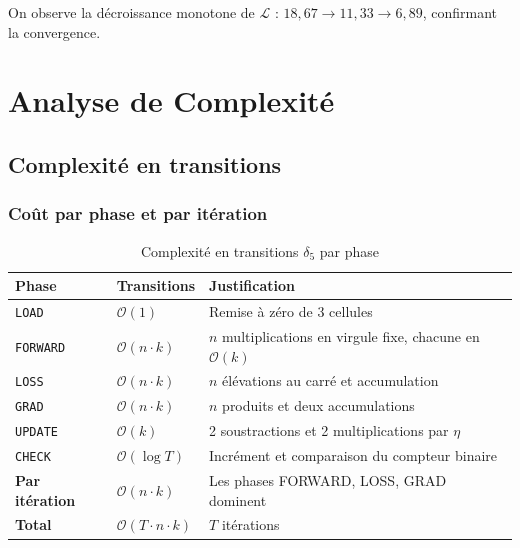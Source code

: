 \documentclass[12pt, a4paper, oneside]{report}
\newcommand{\state}[1]{\texttt{#1}}
\begin{document}
\noindent On observe la décroissance monotone de $\mathcal{L}$ : $18{,}67 \to 11{,}33 \to 6{,}89$, confirmant la convergence.

\chapter{Analyse de Complexité}

\section{Complexité en transitions}

\subsection{Coût par phase et par itération}

\begin{table}[H]
  \centering
  \caption{Complexité en transitions $\delta_5$ par phase}
  \label{tab:complex}
  \renewcommand{\arraystretch}{1.4}
  \begin{tabularx}{\textwidth}{l l X}
    \toprule
    \textbf{Phase} & \textbf{Transitions} & \textbf{Justification} \\
    \midrule
    \state{LOAD}    & $\mathcal{O}(1)$    & Remise à zéro de 3 cellules \\
    \state{FORWARD} & $\mathcal{O}(n \cdot k)$ & $n$ multiplications en virgule fixe, chacune en $\mathcal{O}(k)$ \\
    \state{LOSS}    & $\mathcal{O}(n \cdot k)$ & $n$ élévations au carré et accumulation \\
    \state{GRAD}    & $\mathcal{O}(n \cdot k)$ & $n$ produits et deux accumulations \\
    \state{UPDATE}  & $\mathcal{O}(k)$    & 2 soustractions et 2 multiplications par $\eta$ \\
    \state{CHECK}   & $\mathcal{O}(\log T)$ & Incrément et comparaison du compteur binaire \\
    \midrule
    \textbf{Par itération} & $\mathcal{O}(n \cdot k)$ & Les phases FORWARD, LOSS, GRAD dominent \\
    \textbf{Total} & $\mathcal{O}(T \cdot n \cdot k)$ & $T$ itérations \\
    \bottomrule
  \end{tabularx}
\end{table}
\end{document}
